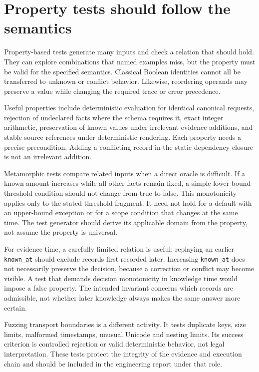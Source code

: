\section{Property tests should follow the semantics}

Property-based tests generate many inputs and check a relation that should hold.
They can explore combinations that named examples miss, but the property must
be valid for the specified semantics. Classical Boolean identities cannot all be
transferred to unknown or conflict behavior. Likewise, reordering operands may
preserve a value while changing the required trace or error precedence.

Useful properties include deterministic evaluation for identical canonical
requests, rejection of undeclared facts where the schema requires it, exact
integer arithmetic, preservation of known values under irrelevant evidence
additions, and stable source references under deterministic rendering. Each
property needs a precise precondition. Adding a conflicting record in the static
dependency closure is not an irrelevant addition.

Metamorphic tests compare related inputs when a direct oracle is difficult. If a
known amount increases while all other facts remain fixed, a simple lower-bound
threshold condition should not change from true to false. This monotonicity
applies only to the stated threshold fragment. It need not hold for a default
with an upper-bound exception or for a scope condition that changes at the same
time. The test generator should derive its applicable domain from the property,
not assume the property is universal.

For evidence time, a carefully limited relation is useful: replaying an earlier
\texttt{known\_at} should exclude records first recorded later. Increasing
\texttt{known\_at} does not necessarily preserve the decision, because a correction
or conflict may become visible. A test that demands decision monotonicity in
knowledge time would impose a false property. The intended invariant concerns
which records are admissible, not whether later knowledge always makes the same
answer more certain.

Fuzzing transport boundaries is a different activity. It tests duplicate keys,
size limits, malformed timestamps, unusual Unicode and nesting limits. Its
success criterion is controlled rejection or valid deterministic behavior, not
legal interpretation. These tests protect the integrity of the evidence and
execution chain and should be included in the engineering report under that role.

